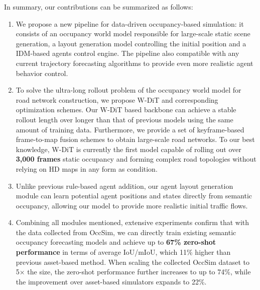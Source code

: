 In summary, our contributions can be summarized as follows:
\begin{enumerate}
    \item We propose a new pipeline for data-driven occupancy-based simulation: it consists of an occupancy world model responsible for large-scale static scene generation, a layout generation model controlling the initial position and a IDM-based agents control engine. The pipeline also compatible with any current trajectory forecasting algorithms to provide even more realistic agent behavior control. 
    \item To solve the ultra-long rollout problem of the occupancy world model for road network construction, we propose W-DiT and corresponding optimization schemes. Our W-DiT based backbone can achieve a stable rollout length over \bm{$80\times$} longer than that of previous models using the same amount of training data. Furthermore, we provide a set of keyframe-based frame-to-map fusion schemes to obtain large-scale road networks. To our best knowledge, W-DiT is currently the first model capable of rolling out over \textbf{3,000 frames} static occupancy and forming complex road topologies without relying on HD maps in any form as condition. 
    \item Unlike previous rule-based agent addition, our agent layout generation module can learn potential agent positions and states directly from semantic occupancy, allowing our model to provide more realistic initial traffic flows. 
    \item Combining all modules mentioned, extensive experiments confirm that with the data collected from OccSim, we can directly train existing semantic occupancy forecasting models and achieve up to \textbf{67\% zero-shot performance} in terms of average IoU/mIoU, which 11\% higher than previous asset-based method. When scaling the collected OccSim dataset to 5× the size, the zero-shot performance further increases to up to 74\%, while the improvement over asset-based simulators expands to 22\%.
\end{enumerate}
